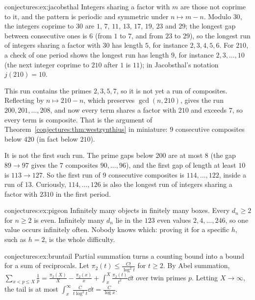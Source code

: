 \begin{solution}{conjectures:ex:jacobsthal}
\idea Integers sharing a factor with $m$ are those not coprime to it, and the pattern is periodic and symmetric under $n\mapsto m-n$.
\writeup Modulo $30$, the integers coprime to $30$ are $1$, $7$, $11$, $13$, $17$, $19$, $23$ and $29$; the longest gap between consecutive ones is $6$ (from $1$ to $7$, and from
$23$ to $29$), so the longest run of integers sharing a factor with $30$ has length $5$, for instance $2,3,4,5,6$. For $210$, a check of one period shows
the longest run has length $9$, for instance $2,3,\dots,10$ (the next integer coprime to $210$ after $1$ is $11$); in Jacobsthal's notation $j(210)=10$.

This run contains the primes $2,3,5,7$, so it is not yet a run of composites. Reflecting by $n\mapsto210-n$, which preserves $\gcd(n,210)$, gives the run
$200,201,\dots,208$, and now every term shares a factor with $210$ and exceeds $7$, so every term is composite. That is the argument of
Theorem~\ref{conjectures:thm:westzynthius} in miniature: $9$ consecutive composites below $420$ (in fact below $210$).

It is not the first such run. The prime gaps below $200$ are at most $8$ (the gap $89\to97$ gives the $7$ composites $90,\dots,96$), and the first gap of
length at least $10$ is $113\to127$. So the first run of $9$ consecutive composites is $114,\dots,122$, inside a run of $13$. Curiously, $114,\dots,126$ is
also the longest run of integers sharing a factor with $2310$ in the first period.
\end{solution}

\begin{solution}{conjectures:ex:pigeon}
\idea Infinitely many objects in finitely many boxes.
\writeup Every $d_n\ge2$ for $n\ge2$ is even. Infinitely many $d_n$ lie in the $123$ even values $2,4,\dots,246$, so one value occurs infinitely often.
Nobody knows which: proving it for a specific $h$, such as $h=2$, is the whole difficulty.
\end{solution}

\begin{solution}{conjectures:ex:bruntail}
\idea Partial summation turns a counting bound into a bound for a sum of reciprocals.
\writeup Let $\pi_2(t)\le\frac{Ct}{\log^2t}$ for $t\ge2$. By Abel summation, $\sum_{x<p\le X}\frac1p=\frac{\pi_2(X)}X-\frac{\pi_2(x)}x+\int_x^X\frac{\pi_2(t)}{t^2}\dd t$
over twin primes $p$. Letting $X\to\infty$, the tail is at most $\int_x^\infty\frac C{t\log^2t}\dd t=\frac C{\log x}$.
\end{solution}

